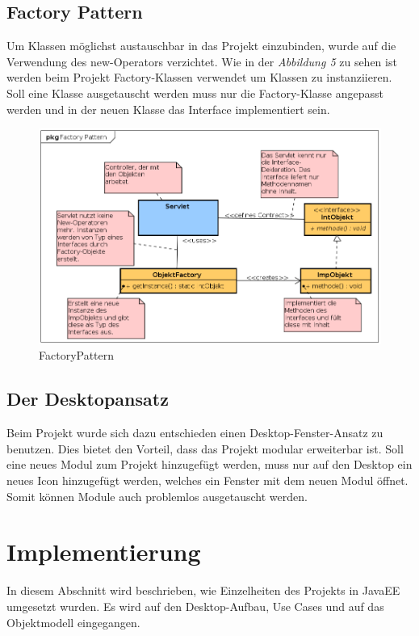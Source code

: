 \documentclass[12pt, a4paper]{article}
\begin{document}
\subsection{Factory Pattern}
Um Klassen möglichst austauschbar in das Projekt einzubinden, wurde auf die Verwendung des \glqq new-Operators\grqq{} verzichtet. Wie in der \textit{Abbildung 5} zu sehen ist werden beim Projekt \glqq Factory-Klassen\grqq{} verwendet um Klassen zu instanziieren. Soll eine Klasse ausgetauscht werden muss nur die Factory-Klasse angepasst werden und in der neuen Klasse das Interface implementiert sein.

\begin{figure}[H]
	\begin{center}
		\includegraphics[width=120mm]{Bilder/FactoryPattern.png}
	\end{center}
	\caption{FactoryPattern}
\end{figure}


\subsection{Der Desktopansatz}
Beim Projekt wurde sich dazu entschieden einen Desktop-Fenster-Ansatz zu benutzen. Dies bietet den Vorteil, dass das Projekt modular erweiterbar ist. Soll eine neues Modul zum Projekt hinzugefügt werden, muss nur auf den Desktop ein neues Icon hinzugefügt werden, welches ein Fenster mit dem neuen Modul öffnet. Somit können Module auch problemlos ausgetauscht werden.

\pagebreak
\section{Implementierung}
In diesem Abschnitt wird beschrieben, wie Einzelheiten des Projekts in JavaEE umgesetzt wurden. Es wird auf den Desktop-Aufbau, Use Cases und auf das Objektmodell eingegangen.
\end{document}
